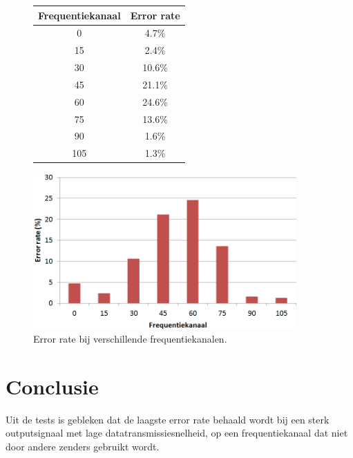 \documentclass[a4paper,10pt]{article}
\begin{document}
\begin{figure}[h!]
    \begin{minipage}{\textwidth}
        \begin{minipage}{0.49\textwidth}
            \centering
            \begin{tabular}{cc} \hline
                Frequentiekanaal    &  Error rate   \\ \hline
                0                   &  4.7\%        \\
                15                  &  2.4\%        \\
                30                  &  10.6\%       \\
                45                  &  21.1\%       \\
                60                  &  24.6\%       \\
                75                  &  13.6\%       \\
                90                  &  1.6\%        \\
                105                 &  1.3\%        \\ \hline
            \end{tabular}
        \end{minipage}
        \hfill
        \begin{minipage}{0.49\textwidth}
            \centering
            \includegraphics[width=0.9\textwidth]{frequentiekanaal.png}
        \end{minipage}
        \caption{Error rate bij verschillende frequentiekanalen.}
        \label{fig:freqkanaal_table}
    \end{minipage}
\end{figure}

\section{Conclusie}
Uit de tests is gebleken dat de laagste error rate behaald wordt bij een sterk outputsignaal met lage datatransmissiesnelheid, op een frequentiekanaal dat niet door andere zenders gebruikt wordt.
\end{document}
